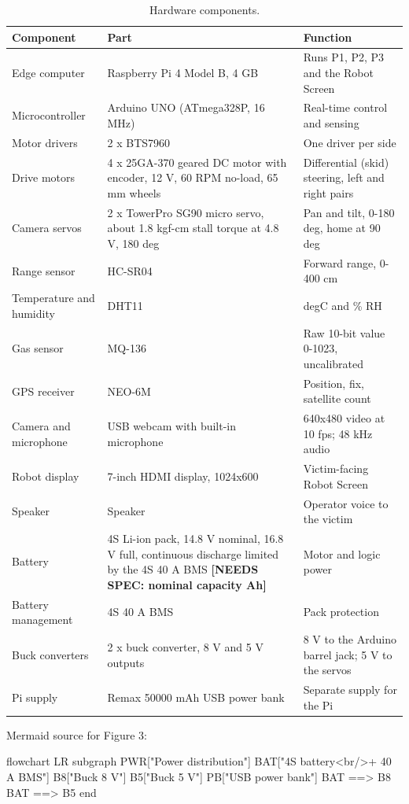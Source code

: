 \begin{table}[!t]
\centering
\caption{Hardware components.}
\label{tab:2}
\begin{tabularx}{\linewidth}{p{3.3cm} X p{3.6cm}}
\toprule
Component & Part & Function \\
\midrule
Edge computer & Raspberry Pi 4 Model B, 4 GB & Runs P1, P2, P3 and the Robot Screen \\
Microcontroller & Arduino UNO (ATmega328P, 16 MHz) & Real-time control and sensing \\
Motor drivers & 2 x BTS7960 & One driver per side \\
Drive motors & 4 x 25GA-370 geared DC motor with encoder, 12 V, 60 RPM no-load, 65 mm wheels & Differential (skid) steering, left and right pairs \\
Camera servos & 2 x TowerPro SG90 micro servo, about 1.8 kgf-cm stall torque at 4.8 V, 180 deg & Pan and tilt, 0-180 deg, home at 90 deg \\
Range sensor & HC-SR04 & Forward range, 0-400 cm \\
Temperature and humidity & DHT11 & degC and \% RH \\
Gas sensor & MQ-136 & Raw 10-bit value 0-1023, uncalibrated \\
GPS receiver & NEO-6M & Position, fix, satellite count \\
Camera and microphone & USB webcam with built-in microphone & 640x480 video at 10 fps; 48 kHz audio \\
Robot display & 7-inch HDMI display, 1024x600 & Victim-facing Robot Screen \\
Speaker & Speaker & Operator voice to the victim \\
Battery & 4S Li-ion pack, 14.8 V nominal, 16.8 V full, continuous discharge limited by the 4S 40 A BMS \textbf{[NEEDS SPEC: nominal capacity Ah]} & Motor and logic power \\
Battery management & 4S 40 A BMS & Pack protection \\
Buck converters & 2 x buck converter, 8 V and 5 V outputs & 8 V to the Arduino barrel jack; 5 V to the servos \\
Pi supply & Remax 50000 mAh USB power bank & Separate supply for the Pi \\
\bottomrule
\end{tabularx}
\end{table}

\iffalse
Mermaid source for Figure 3:

flowchart LR
  subgraph PWR["Power distribution"]
    BAT["4S battery<br/>+ 40 A BMS"]
    B8["Buck 8 V"]
    B5["Buck 5 V"]
    PB["USB power bank"]
    BAT ==> B8
    BAT ==> B5
  end

